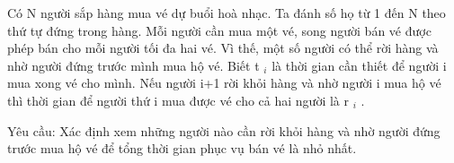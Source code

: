 Có N người sắp hàng mua vé dự buổi hoà nhạc. Ta đánh số họ từ 1 đến N theo thứ tự   đứng trong hàng. Mỗi người cần mua một vé, song người bán vé được phép bán cho mỗi   người tối đa hai vé. Vì thế, một số người có thể rời hàng và nhờ người đứng trước mình mua   hộ vé. Biết t   $_    i   $   là thời gian cần thiết để người i mua xong vé cho mình. Nếu người   i+1 rời khỏi hàng và nhờ người i mua hộ vé thì thời gian để người thứ i mua được vé cho cả   hai người là r   $_    i   $   .  

   Yêu cầu: Xác định xem những người nào cần rời khỏi hàng và nhờ người đứng trước mua   hộ vé để tổng thời gian phục vụ bán vé là nhỏ nhất.  

\